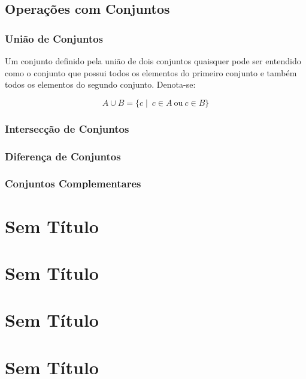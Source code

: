 \documentclass[]{book}
\begin{document}
\section{Operações com Conjuntos}\label{operacoes-com-conjuntos}

\subsection{União de Conjuntos}\label{uniao-de-conjuntos}

Um conjunto definido pela união de dois conjuntos quaisquer pode ser
entendido como o conjunto que possui todos os elementos do primeiro
conjunto e também todos os elementos do segundo conjunto. Denota-se:

\[A \cup B = \{c \mid \ c \in A \ \text{ou} \ c \in B \}\]

\subsection{Intersecção de Conjuntos}\label{interseccao-de-conjuntos}

\subsection{Diferença de Conjuntos}\label{diferenca-de-conjuntos}

\subsection{Conjuntos Complementares}\label{conjuntos-complementares}

\chapter{Sem Título}\label{sem-titulo}

\chapter{Sem Título}\label{sem-titulo-1}

\chapter{Sem Título}\label{sem-titulo-2}

\chapter{Sem Título}\label{sem-titulo-3}


\end{document}
